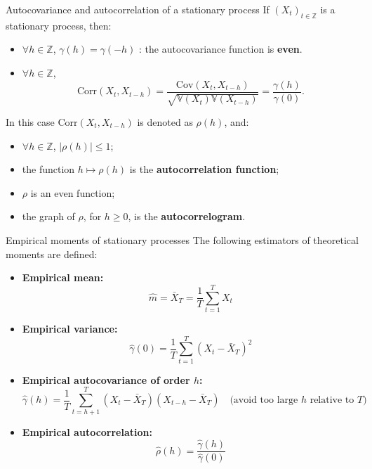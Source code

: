 \documentclass{beamer}
\begin{document}
\begin{frame}{Autocovariance and autocorrelation of a stationary process}
\small
If $(X_t)_{t \in \mathbb{Z}}$ is a stationary process, then:
\begin{itemize}
    \item $\forall h \in \mathbb{Z}$, $\gamma(h) = \gamma(-h)$ :  
    the autocovariance function is \textbf{even}.
    \item $\forall h \in \mathbb{Z}$, 
    \[
    \mathrm{Corr}(X_t, X_{t-h}) = 
    \frac{\mathrm{Cov}(X_t, X_{t-h})}
         {\sqrt{\mathbb{V}(X_t)\mathbb{V}(X_{t-h})}}
    = \frac{\gamma(h)}{\gamma(0)}.
    \]
\end{itemize}

In this case $\mathrm{Corr}(X_t, X_{t-h})$ is denoted as $\rho(h)$, and:
\begin{itemize}
    \item $\forall h \in \mathbb{Z}$, $|\rho(h)| \le 1$;
    \item the function $h \mapsto \rho(h)$ is the \textbf{autocorrelation function};
    \item $\rho$ is an even function;
    \item the graph of $\rho$, for $h \ge 0$, is the \textbf{autocorrelogram}.
\end{itemize}
\end{frame}



\begin{frame}{Empirical moments of stationary processes}
\small
The following estimators of theoretical moments are defined:

\begin{itemize}
    \item \textbf{Empirical mean:}
    \[
    \hat m = \bar X_T = \frac{1}{T}\sum_{t=1}^T X_t
    \]
    \item \textbf{Empirical variance:}
    \[
    \hat \gamma(0) = \frac{1}{T}\sum_{t=1}^T (X_t - \bar X_T)^2
    \]
    \item \textbf{Empirical autocovariance of order $h$:}
    \[
    \hat \gamma(h) = \frac{1}{T} \sum_{t=h+1}^T (X_t - \bar X_T)(X_{t-h} - \bar X_T)
    \quad \text{(avoid too large $h$ relative to $T$)}
    \]
    \item \textbf{Empirical autocorrelation:}
    \[
    \hat \rho(h) = \frac{\hat \gamma(h)}{\hat \gamma(0)}
    \]
    \end{itemize}
\end{frame}
\end{document}

